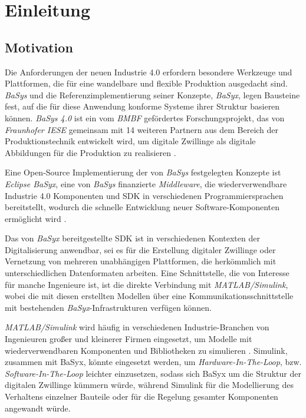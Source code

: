 \chapter{Einleitung}

\section{Motivation}


Die Anforderungen der neuen Industrie 4.0 erfordern besondere Werkzeuge und Plattformen, die für eine wandelbare und flexible Produktion ausgedacht sind. \textit{BaSys} und die Referenzimplementierung seiner Konzepte, \textit{BaSyx}, legen Bausteine fest, auf die für diese Anwendung konforme Systeme ihrer Struktur basieren können. \textit{BaSys 4.0} ist ein vom \textit{BMBF} gefördertes Forschungsprojekt, das von \textit{Fraunhofer IESE} gemeinsam mit 14 weiteren Partnern aus dem Bereich der Produktionstechnik entwickelt wird, um digitale Zwillinge als digitale Abbildungen für die Produktion zu realisieren \cite{fraunhofer-institutfurexperimentellessoftwareengineeringieseBaSysFlyer}. 

Eine Open-Source Implementierung der von \textit{BaSys} festgelegten Konzepte ist \textit{Eclipse BaSyx}, eine von \textit{BaSys} finanzierte \textit{Middleware}, die wiederverwendbare Industrie 4.0 Komponenten und SDK in verschiedenen Programmiersprachen bereitstellt, wodurch die schnelle Entwicklung neuer Software-Komponenten ermöglicht wird \cite{eclipsefoundationinc.BaSyxEclipsepedia}.

Das von \textit{BaSyx} bereitgestellte SDK ist in verschiedenen Kontexten der Digitalisierung anwendbar, sei es für die Erstellung digitaler Zwillinge oder Vernetzung von mehreren unabhängigen Plattformen, die herkömmlich mit unterschiedlichen Datenformaten arbeiten. Eine Schnittstelle, die von Interesse für manche Ingenieure ist, ist die direkte Verbindung mit \textit{MATLAB/Simulink}, wobei die mit diesen erstellten Modellen über eine Kommunikationsschnittstelle mit bestehenden \textit{BaSyx}-Infrastrukturen verfügen können. 

\textit{MATLAB/Simulink} wird häufig in verschiedenen Industrie-Branchen von Ingenieuren großer und kleinerer Firmen eingesetzt, um Modelle mit wiederverwendbaren Komponenten und Bibliotheken zu simulieren \cite{enlyftSimulinkMarketShare} \cite{themathworksinc.SimulinkGettingStarted}. Simulink, zusammen mit BaSyx, könnte eingesetzt werden, um \textit{Hardware-In-The-Loop}, bzw. \textit{Software-In-The-Loop} leichter einzusetzen, sodass sich BaSyx um die Struktur der digitalen Zwillinge kümmern würde, während Simulink für die Modellierung des Verhaltens einzelner Bauteile oder für die Regelung gesamter Komponenten angewandt würde. 

